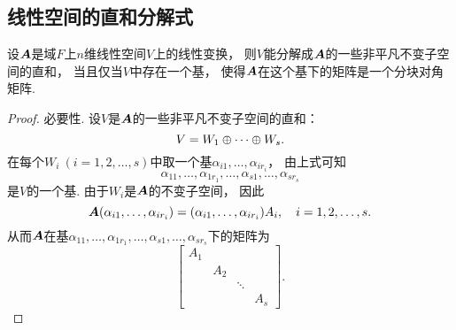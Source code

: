 \subsection{线性空间的直和分解式}
\begin{theorem}\label{theorem:线性映射.线性空间可以分解为线性变换的一些非平凡不变子空间的直和的充分必要条件}
设\(\boldsymbol{A}\)是域\(F\)上\(n\)维线性空间\(V\)上的线性变换，
则\(V\)能分解成\(\boldsymbol{A}\)的一些非平凡不变子空间的直和，
当且仅当\(V\)中存在一个基，
使得\(\boldsymbol{A}\)在这个基下的矩阵是一个分块对角矩阵.
\def\BasisV{\alpha_{11},\dotsc,\alpha_{1 r_1},\dotsc,\alpha_{s1},\dotsc,\alpha_{s r_s}}
\def\BasisWi{\alpha_{i1},\dotsc,\alpha_{ir_i}}
\begin{proof}
必要性.
设\(V\)是\(\boldsymbol{A}\)的一些非平凡不变子空间的直和：\begin{equation*}
	V = W_1 \oplus \dotsb \oplus W_s.
\end{equation*}
在每个\(W_i\ (i=1,2,\dotsc,s)\)中取一个基\(\BasisWi\)，
由上式可知\begin{equation*}
	\BasisV
\end{equation*}是\(V\)的一个基.
由于\(W_i\)是\(\boldsymbol{A}\)的不变子空间，
因此\begin{equation*}
	\vb{A} (\BasisWi)
	= (\BasisWi) A_i,
	\quad i=1,2,\dotsc,s.
\end{equation*}
从而\(\boldsymbol{A}\)在基\(\BasisV\)下的矩阵为\begin{equation*}
	\begin{bmatrix}
		A_1 \\
		& A_2 \\
		& & \ddots \\
		& & & A_s
	\end{bmatrix}.
\end{equation*}


\end{proof}
\end{theorem}
